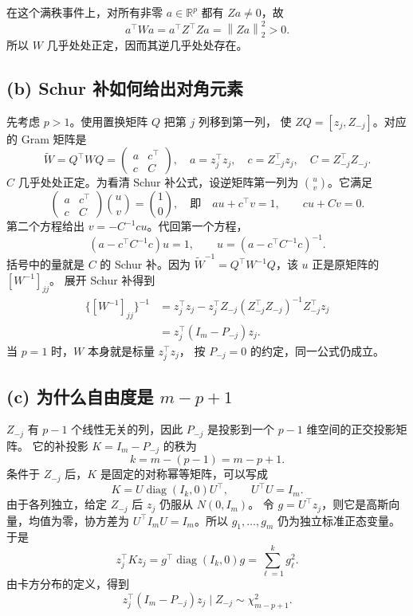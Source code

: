 \documentclass[UTF8,a4paper,11pt,fontset=fandol]{ctexart}
\newcommand{\R}{\mathbb R}
\newcommand{\norm}[1]{\left\lVert#1\right\rVert}
\begin{document}
在这个满秩事件上，对所有非零 $a\in\R^p$ 都有 $Za\ne0$，故
\[
 a^\top Wa=a^\top Z^\top Za=\norm{Za}_2^2>0.
\]
所以 $W$ 几乎处处正定，因而其逆几乎处处存在。

\subsection*{(b) Schur 补如何给出对角元素}
先考虑 $p>1$。使用置换矩阵 $Q$ 把第 $j$ 列移到第一列，
使 $ZQ=[z_j,Z_{-j}]$。对应的 Gram 矩阵是
\[
 \widetilde W=Q^\top WQ
 =\begin{pmatrix}a&c^\top\\c&C\end{pmatrix},
 \quad a=z_j^\top z_j,\quad c=Z_{-j}^\top z_j,\quad C=Z_{-j}^\top Z_{-j}.
\]
$C$ 几乎处处正定。为看清 Schur 补公式，设逆矩阵第一列为
$\binom{u}{v}$。它满足
\[
 \begin{pmatrix}a&c^\top\\c&C\end{pmatrix}
 \binom uv=\binom10,
 \quad\text{即}\quad
 au+c^\top v=1,\qquad cu+Cv=0.
\]
第二个方程给出 $v=-C^{-1}cu$。代回第一个方程，
\[
 (a-c^\top C^{-1}c)u=1,
 \qquad u=(a-c^\top C^{-1}c)^{-1}.
\]
括号中的量就是 $C$ 的 Schur 补。因为
$\widetilde W^{-1}=Q^\top W^{-1}Q$，该 $u$ 正是原矩阵的 $[W^{-1}]_{jj}$。
展开 Schur 补得到
\begin{align*}
 \{[W^{-1}]_{jj}\}^{-1}
 &=z_j^\top z_j-z_j^\top Z_{-j}(Z_{-j}^\top Z_{-j})^{-1}Z_{-j}^\top z_j\\
 &=\boxed{z_j^\top(I_m-P_{-j})z_j}.
\end{align*}
当 $p=1$ 时，$W$ 本身就是标量 $z_j^\top z_j$，
按 $P_{-j}=0$ 的约定，同一公式仍成立。

\subsection*{(c) 为什么自由度是 $m-p+1$}
$Z_{-j}$ 有 $p-1$ 个线性无关的列，因此
$P_{-j}$ 是投影到一个 $p-1$ 维空间的正交投影矩阵。
它的补投影 $K=I_m-P_{-j}$ 的秩为
\[
 k=m-(p-1)=m-p+1.
\]
条件于 $Z_{-j}$ 后，$K$ 是固定的对称幂等矩阵，可以写成
\[
 K=U\operatorname{diag}(I_k,0)U^\top,
 \qquad U^\top U=I_m.
\]
由于各列独立，给定 $Z_{-j}$ 后 $z_j$ 仍服从 $N(0,I_m)$。
令 $g=U^\top z_j$，则它是高斯向量，均值为零，协方差为
$U^\top I_mU=I_m$。所以 $g_1,\ldots,g_m$ 仍为独立标准正态变量。
于是
\[
 z_j^\top Kz_j
 =g^\top\operatorname{diag}(I_k,0)g=\sum_{\ell=1}^k g_\ell^2.
\]
由卡方分布的定义，得到
\[
 \boxed{z_j^\top(I_m-P_{-j})z_j\mid Z_{-j}\sim\chi^2_{m-p+1}.}
\]
\end{document}
